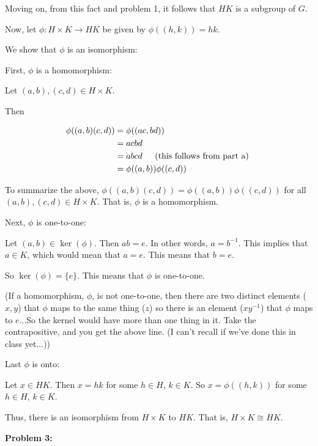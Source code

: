 \documentclass[a4paper,12pt]{article}
\newcommand{\tab}{\hspace{4mm}} %
\newcommand{\shunt}{\vspace{20mm}}
\begin{document}
Moving on, from this fact and problem 1, it follows that $HK$ is a subgroup of $G$.

Now, let $\phi : H \times K \to HK$ be given by $\phi((h,k)) = hk$.

We show that $\phi$ is an isomorphism:

First, $\phi$ is a homomorphism:

\tab Let $(a,b), (c,d) \in H \times K$.

\tab Then 

\begin{align*}
\phi((a,b)(c,d)) &= \phi((ac,bd)) \\
&= acbd \\
&= abcd \tab \text{ (this follows from part a) }\\
&= \phi((a,b))\phi((c,d))
\end{align*}

\tab To summarize the above, $\phi((a,b)(c,d)) = \phi((a,b))\phi((c,d))$ for all $(a,b), (c,d) \in H \times K$. That is, $\phi$ is a homomorphism.

Next, $\phi$ is one-to-one:

\tab Let $(a,b) \in \ker(\phi)$. Then $ab = e$. In other words, $a = b^{-1}$. This implies that $a \in K$, which would mean that $a = e$. This means that $b = e$.

\tab So $\ker(\phi) = \{e\}$. This means that $\phi$ is one-to-one.

\tab \tab (If a homomorphism, $\phi$, is not one-to-one, then there are two distinct elements ($x,y$) that $\phi$ maps to the same thing ($z$) so there is an element ($xy^{-1}$) that $\phi$ maps to $e$...So the kernel would have more than one thing in it. Take the contrapositive, and you get the above line. (I can't recall if we've done this in class yet...))

Last $\phi$ is onto:

\tab Let $x \in HK$. Then $x = hk$ for some $h \in H$, $k \in K$. So $x = \phi((h,k))$ for some $h \in H$, $k \in K$.

Thus, there is an isomorphism from $H \times K$ to $HK$. That is, $H \times K \cong HK$.

\shunt

{\bf Problem 3:}
\end{document}
